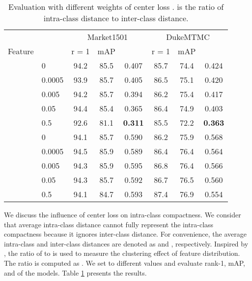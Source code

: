 \documentclass[journal]{IEEEtran}
\begin{document}
\renewcommand{\multirowsetup}{\centering}
\begin{table}[tb]
  \begin{center}
  \begin{tabular}{ cl|ccc|ccc}
\hline
    	    &	& \multicolumn{3}{c|}{Market1501} & \multicolumn{3}{c}{DukeMTMC}	 \\
  Feature   & 		& r = 1  & mAP   &    &r = 1  & mAP   &  \\
 	\hline
	\hline
            &   0		    &94.2    &85.5   &0.407  &85.7   &74.4   &0.424\\
            &   0.0005		&93.9	 &85.7   &0.405	 &86.5	 &75.1   &0.420	\\
       &   0.005		&94.2	 &85.7   &0.394	 &86.2	 &75.4   &0.417	\\
            &   0.05		&94.4	 &85.4   &0.365	 &86.4	 &74.9   &0.403	\\
            &   0.5		    &92.6	 &81.1   &\textbf{0.311} &85.5	 &72.2   &\textbf{0.363}	\\
    \hline
            &   0		    &94.1    &85.7   &0.590  &86.2   &75.9   &0.568\\
            &   0.0005		&94.5	 &85.9   &0.589	 &86.4	 &76.4   &0.564	\\
       &   0.005		&94.3	 &85.9   &0.595	 &86.8	 &76.4   &0.566	\\
            &   0.05		&94.3	 &85.7   &0.592	 &86.7	 &76.5   &0.560	\\
            &   0.5		    &94.1	 &84.7   &0.593	 &87.4	 &76.9   &0.554	\\
\hline

  \end{tabular}
  \end{center}
  \caption{\label{tab:center} Evaluation with different weights of center loss .  is the ratio of intra-class distance to inter-class distance.}
\end{table}


We discuss the influence of center loss on intra-class compactness.
We consider that average intra-class distance cannot fully represent the intra-class compactness because it ignores inter-class distance.
For convenience, the average intra-class and inter-class distances are denoted as  and , respectively. Inspired by \cite{zhang2017range}, the ratio of  to  is used to measure the clustering effect of feature distribution. The ratio is computed as . We set  to different values and evaluate rank-1, mAP, and  of the models. Table \ref{tab:center} presents the results.
\end{document}
